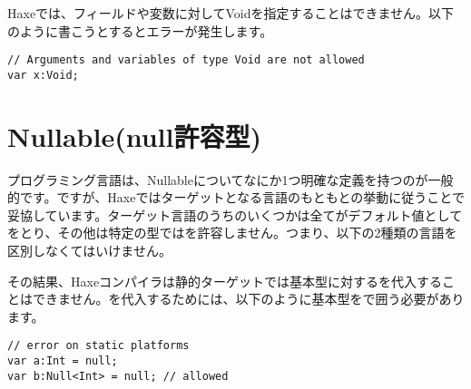 Haxeでは、フィールドや変数に対してVoidを指定することはできません。以下のように書こうとするとエラーが発生します。

\begin{lstlisting}
// Arguments and variables of type Void are not allowed
var x:Void;
\end{lstlisting}



\section{Nullable(null許容型)}
\label{types-nullability}


プログラミング言語は、Nullableについてなにか1つ明確な定義を持つのが一般的です。ですが、Haxeではターゲットとなる言語のもともとの挙動に従うことで妥協しています。ターゲット言語のうちのいくつかは全てがデフォルト値としてをとり、その他は特定の型ではを許容しません。つまり、以下の2種類の言語を区別しなくてはいけません。



その結果、Haxeコンパイラは静的ターゲットでは基本型に対するを代入することはできません。を代入するためには、以下のように基本型をで囲う必要があります。

\begin{lstlisting}
// error on static platforms
var a:Int = null;
var b:Null<Int> = null; // allowed
\end{lstlisting}

